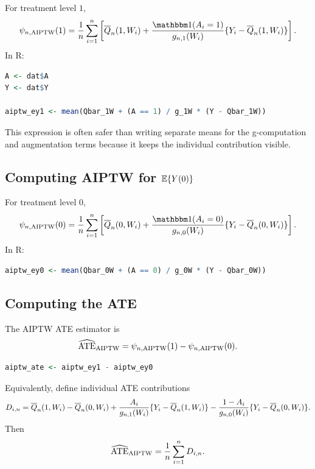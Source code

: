 For treatment level $1$,
\[
\psi_{n,\AIPTW}(1)
=
\frac{1}{n}\sum_{i=1}^n
\left[
\Qbar_n(1,W_i)
+
\frac{\ind(A_i=1)}{g_{n,1}(W_i)}
\{Y_i-\Qbar_n(1,W_i)\}
\right].
\]
In R:

\begin{implementationbox}
\begin{lstlisting}[language=R]
A <- dat$A
Y <- dat$Y

aiptw_ey1 <- mean(Qbar_1W + (A == 1) / g_1W * (Y - Qbar_1W))
\end{lstlisting}
\end{implementationbox}

This expression is often safer than writing separate means for the g-computation and
augmentation terms because it keeps the individual contribution visible.

\subsection{Computing AIPTW for $\mathbb{E}\{Y(0)\}$}

For treatment level $0$,
\[
\psi_{n,\AIPTW}(0)
=
\frac{1}{n}\sum_{i=1}^n
\left[
\Qbar_n(0,W_i)
+
\frac{\ind(A_i=0)}{g_{n,0}(W_i)}
\{Y_i-\Qbar_n(0,W_i)\}
\right].
\]
In R:

\begin{implementationbox}
\begin{lstlisting}[language=R]
aiptw_ey0 <- mean(Qbar_0W + (A == 0) / g_0W * (Y - Qbar_0W))
\end{lstlisting}
\end{implementationbox}

\subsection{Computing the ATE}

The AIPTW ATE estimator is
\[
\widehat{\operatorname{ATE}}_{\operatorname{AIPTW}}
=
\psi_{n,\operatorname{AIPTW}}(1)-\psi_{n,\operatorname{AIPTW}}(0).
\]

\begin{implementationbox}
\begin{lstlisting}[language=R]
aiptw_ate <- aiptw_ey1 - aiptw_ey0
\end{lstlisting}
\end{implementationbox}

Equivalently, define individual ATE contributions
\[
D_{i,n}
=
\overline{Q}_n(1,W_i)-\overline{Q}_n(0,W_i)
+
\frac{A_i}{g_{n,1}(W_i)}\{Y_i-\overline{Q}_n(1,W_i)\}
-
\frac{1-A_i}{g_{n,0}(W_i)}\{Y_i-\overline{Q}_n(0,W_i)\}.
\]
Then
\[
\widehat{\operatorname{ATE}}_{\operatorname{AIPTW}}=\frac{1}{n}\sum_{i=1}^nD_{i,n}.
\]

